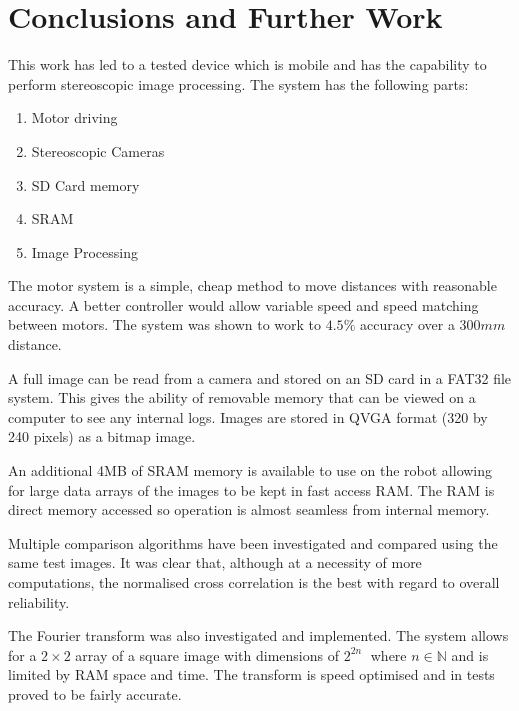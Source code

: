\chapter{Conclusions and Further Work} \label{Chapter: Conclusions}

This work has led to a tested device which is mobile and has the capability to perform stereoscopic image processing. The system has the following parts:

\begin{enumerate}
\item Motor driving
\item Stereoscopic Cameras
\item SD Card memory
\item SRAM
\item Image Processing
\end{enumerate} 

The motor system is a simple, cheap method to move distances with reasonable accuracy. A better controller would allow variable speed and speed matching between motors. The system was shown to work to $4.5\%$ accuracy over a $300mm$ distance.

A full image can be read from a camera and stored on an SD card in a FAT32 file system. This gives the ability of removable memory that can be viewed on a computer to see any internal logs. Images are stored in QVGA format (320 by 240 pixels) as a bitmap image. 

An additional 4MB of SRAM memory is available to use on the robot allowing for large data arrays of the images to be kept in fast access RAM. The RAM is direct memory accessed so operation is almost seamless from internal memory.

Multiple comparison algorithms have been investigated and compared using the same test images. It was clear that, although at a necessity of more computations, the normalised cross correlation is the best with regard to overall reliability. 

The Fourier transform was also investigated and implemented. The system allows for a $2 \times 2$ array of a square image with dimensions of $2^{2n}\; $ where $n \in \mathbb{N}$ and is limited by RAM space and time. The transform is speed optimised and in tests proved to be fairly accurate. 

